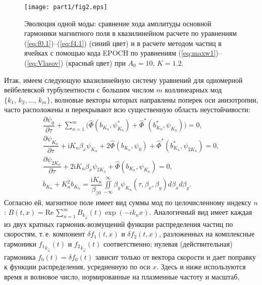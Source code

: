\begin{figure}[b]
\texttt{[image: part1/fig2.eps]}
\centering
\caption{Эволюция одной моды: сравнение хода амплитуды основной гармоники магнитного поля в квазилинейном расчете по уравнениям (\ref{eq:f0.1})--(\ref{eq:f4.1}) (синий цвет) и в расчете методом частиц в ячейках с помощью кода EPOCH по уравнениям (\ref{eq:maxw1})--(\ref{eq:Vlasov}) (красный цвет) при $A_0=10$, $K=1.2$.}
\label{fig:srav_PIC}
\end{figure}

Итак, имеем следующую квазилинейную систему уравнений для одномерной вейбелевской турбулентности с большим числом $m$ коллинеарных мод $\{ k_1,\, k_2,...,\,k_{m} \}$, волновые векторы которых направлены поперек оси анизотропии, часто расположены и перекрывают всю существенную область неустойчивости: 
\begin{align}
\label{eq:f0.3}
\dfrac{\partial \psi_0}{\partial \tau}+\sum\limits^{m}_{n=1}\bigg(\hat \Phi(b_{K_n},\psi_{K_n}^*)+\hat \Phi^*(b_{K_n}^*,\psi_{K_n})\bigg)=0, \\
\label{eq:f1.3}
\dfrac{\partial \psi_{K_n}}{\partial \tau}+\mathrm{i}K_n\beta_x\psi_{K_n}+2\hat \Phi(b_{K_n},\psi_0)+\hat \Phi^*(b_{K_n}^*,\psi_{2K_n})=0, \\
\label{eq:f2.3}
\dfrac{\partial \psi_{2K_n}}{\partial \tau}+2\mathrm{i}K_n\beta_x\psi_{2K_n}+\hat \Phi(b_{K_n},\psi_{K_n})=0,\\
\label{eq:max_eq}
\ddot b_{K_n}+K_n^2b_{K_n}=\dfrac{\mathrm{i}K_n}{\beta_{||0}}\iint\limits^{\infty}_{-\infty}\beta_y\psi_{K_n}(\tau,\beta_x,\beta_y) d\beta_x d\beta_y.
\end{align}
Согласно ей, магнитное поле имеет вид суммы мод по целочисленному индексу $n$:
$B(t,x)= \mathrm{Re} \, \sum^{m}_{n=1}B_{k_{\vec{n}}}(t)\exp(- ik_{n}x)$.
Аналогичный вид имеет каждая из двух кратных гармоник-возмущений функции распределения частиц по скоростям, т.\,е. компонент $\delta f_1(t,x)$ и $\delta f_2(t,x)$, разложенных на комплексные гармоники ${f_1}_{k_{\vec{n}}}(t)$ и ${f_2}_{k_{\vec{n}}}(t)$ соответственно; нулевая (действительная) гармоника $f_0(t)=\delta f_0(t)$ зависит только от вектора скорости и дает поправку к функции распределения, усредненную по оси $x$. Здесь и ниже используются время и волновое число, нормированные на плазменные частоту и масштаб,
